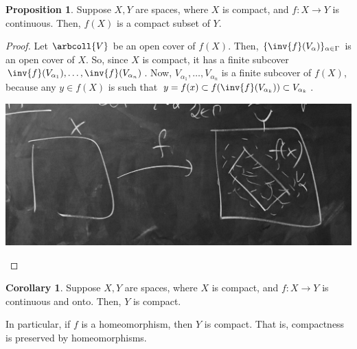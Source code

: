 \documentclass[a5paper]{article}
\theoremstyle{definition}%
\newtheorem{corollary}[theorem]{Corollary}
\newtheorem{proposition}[theorem]{Proposition}
\numberwithin{exercise}{section}
\theoremstyle{remark}%
\begin{document}
\begin{highlight}
\begin{proposition}
Suppose $X,Y$ are spaces, where $X$ is compact, and $f:X\to Y$ is continuous. Then, $f(X)$ is a compact subset of $Y$. 
\end{proposition}
\end{highlight}
\begin{proof}
Let $\arbcoll{V}$ be an open cover of $f(X)$. Then, $\{\inv{f}(V_\alpha)\}_{\alpha\in\Gamma}$ is an open cover of $X$. So, since $X$ is compact, it has a finite subcover $\inv{f}(V_{\alpha_1}), \ldots, \inv{f}(V_{\alpha_n})$. Now, $V_{\alpha_1}, \ldots, V_{\alpha_n}$ is a finite subcover of $f(X)$, because any $y\in f(X)$ is such that $y=f(x)\subset f(\inv{f}(V_{\alpha_k}))\subset V_{\alpha_k}$. 

\begin{center}
\includegraphics[scale=.06]{images/pf16_fig}
\end{center}

\end{proof}

\begin{highlight}
\begin{corollary}
Suppose $X,Y$ are spaces, where $X$ is compact, and $f:X\to Y$ is continuous and onto. Then, $Y$ is compact. 

In particular, if $f$ is a homeomorphism, then $Y$ is compact. That is, compactness is preserved by homeomorphisms. 
\end{corollary}
\end{highlight}
\end{document}

